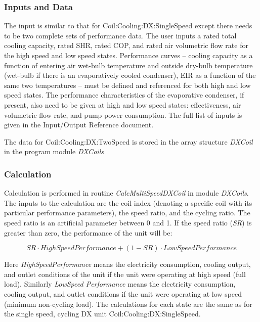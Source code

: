 \subsubsection{Inputs and Data}\label{inputs-and-data-001}

The input is similar to that for Coil:Cooling:DX:SingleSpeed except there needs to be two complete sets of performance data. The user inputs a rated total cooling capacity, rated SHR, rated COP, and rated air volumetric flow rate for the high speed and low speed states. Performance curves -- cooling capacity as a function of entering air wet-bulb temperature and outside dry-bulb temperature (wet-bulb if there is an evaporatively cooled condenser), EIR as a function of the same two temperatures -- must be defined and referenced for both high and low speed states. The performance characteristics of the evaporative condenser, if present, also need to be given at high and low speed states: effectiveness, air volumetric flow rate, and pump power consumption. The full list of inputs is given in the Input/Output Reference document.

The data for Coil:Cooling:DX:TwoSpeed is stored in the array structure \emph{DXCoil} in the program module \emph{DXCoils}

\subsubsection{Calculation}\label{calculation-000}

Calculation is performed in routine \emph{CalcMultiSpeedDXCoil} in module \emph{DXCoils}. The inputs to the calculation are the coil index (denoting a specific coil with its particular performance parameters), the speed ratio, and the cycling ratio. The speed ratio is an artificial parameter between 0 and 1. If the speed ratio (\emph{SR}) is greater than zero, the performance of the unit will be:

\begin{equation}
SR\cdot HighSpeedPerformance + (1 - SR)\cdot LowSpeedPerformance
\end{equation}

Here \emph{HighSpeedPerformance} means the electricity consumption, cooling output, and outlet conditions of the unit if the unit were operating at high speed (full load). Similarly \emph{LowSpeed Performance} means the electricity consumption, cooling output, and outlet conditions if the unit were operating at low speed (minimum non-cycling load). The calculations for each state are the same as for the single speed, cycling DX unit Coil:Cooling:DX:SingleSpeed.

